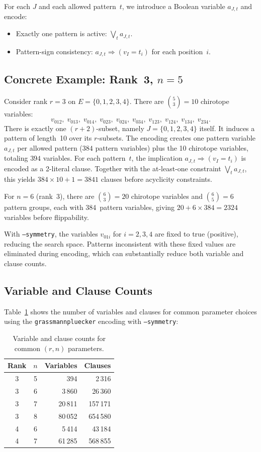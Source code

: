 \documentclass[11pt]{article}
\theoremstyle{definition}
\begin{document}
For each $J$ and each allowed pattern~$t$, we introduce a Boolean variable $a_{J,t}$ and encode:
\begin{itemize}
\item Exactly one pattern is active: $\bigvee_t a_{J,t}$.
\item Pattern-sign consistency: $a_{J,t} \Rightarrow (v_I = t_i)$ for each position~$i$.
\end{itemize}

\subsection{Concrete Example: Rank~3, $n=5$}

Consider rank $r=3$ on $E=\{0,1,2,3,4\}$. There are $\binom{5}{3}=10$ chirotope variables:
\[
v_{012},\; v_{013},\; v_{014},\; v_{023},\; v_{024},\; v_{034},\; v_{123},\; v_{124},\; v_{134},\; v_{234}.
\]
There is exactly one $(r{+}2)$-subset, namely $J = \{0,1,2,3,4\}$ itself. It induces a pattern of length~10 over its $r$-subsets. The encoding creates one pattern variable $a_{J,t}$ per allowed pattern ($384$ pattern variables) plus the 10 chirotope variables, totaling $394$ variables. For each pattern~$t$, the implication $a_{J,t} \Rightarrow (v_I = t_i)$ is encoded as a 2-literal clause. Together with the at-least-one constraint $\bigvee_t a_{J,t}$, this yields $384 \times 10 + 1 = 3841$ clauses before acyclicity constraints.

For $n=6$ (rank~3), there are $\binom{6}{3}=20$ chirotope variables and $\binom{6}{5}=6$ pattern groups, each with 384~pattern variables, giving $20 + 6 \times 384 = 2324$ variables before flippability.

With \texttt{--symmetry}, the variables $v_{01i}$ for $i=2,3,4$ are fixed to true (positive), reducing the search space. Patterns inconsistent with these fixed values are eliminated during encoding, which can substantially reduce both variable and clause counts.

\subsection{Variable and Clause Counts}

Table~\ref{tab:counts} shows the number of variables and clauses for common parameter choices using the \texttt{grassmannpluecker} encoding with \texttt{--symmetry}:

\begin{table}[h]
\centering
\begin{tabular}{ccrr}
\toprule
Rank & $n$ & Variables & Clauses \\
\midrule
3 & 5 &  394 &     2\,316 \\
3 & 6 &  3\,860 &   26\,360 \\
3 & 7 &  20\,811 &  157\,171 \\
3 & 8 &  80\,052 &  654\,580 \\
4 & 6 &  5\,414 &   43\,184 \\
4 & 7 &  61\,285 &  568\,855 \\
\bottomrule
\end{tabular}
\caption{Variable and clause counts for common $(r,n)$ parameters.}
\label{tab:counts}
\end{table}
\end{document}
